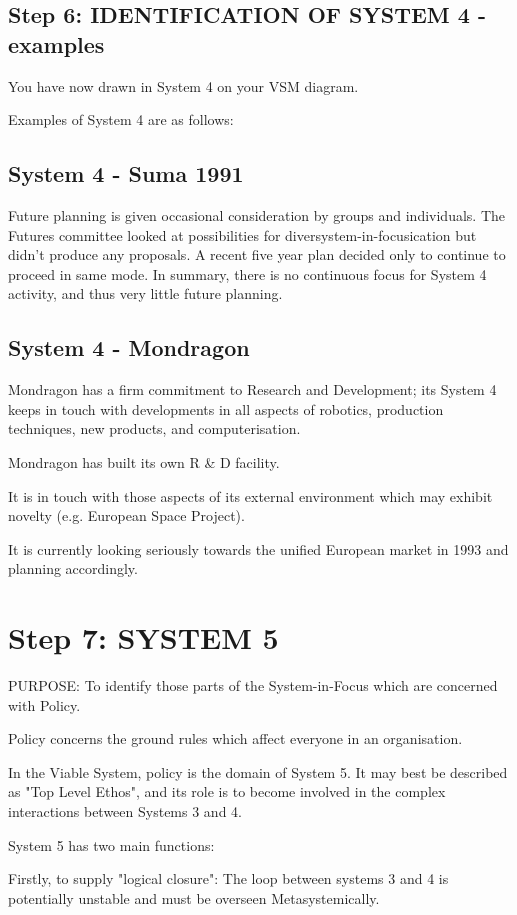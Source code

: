 \subsection*{Step 6: IDENTIFICATION OF SYSTEM 4 - examples}
You have now drawn in System 4 on your VSM diagram.

Examples of System 4 are as follows:

\subsection*{System 4 - Suma 1991}
Future planning is given occasional consideration by groups and individuals. The Futures committee looked at possibilities for diversystem-in-focusication but didn't produce any proposals. A recent five year plan decided only to continue to proceed in same mode. In summary, there is no continuous focus for System 4 activity, and thus very little future planning.

\subsection*{System 4 - Mondragon}
Mondragon has a firm commitment to Research and Development; its System 4 keeps in touch with developments in all aspects of robotics, production techniques, new products, and computerisation.

Mondragon has built its own R \& D facility.

It is in touch with those aspects of its external environment which may exhibit novelty (e.g. European Space Project).

It is currently looking seriously towards the unified European market in 1993 and planning accordingly.

\section*{Step 7: SYSTEM 5}
PURPOSE: To identify those parts of the System-in-Focus which are concerned with Policy.

Policy concerns the ground rules which affect everyone in an organisation.

In the Viable System, policy is the domain of System 5. It may best be described as "Top Level Ethos", and its role is to become involved in the complex interactions between Systems 3 and 4.

System 5 has two main functions:

Firstly, to supply "logical closure": The loop between systems 3 and 4 is potentially unstable and must be overseen Metasystemically.

